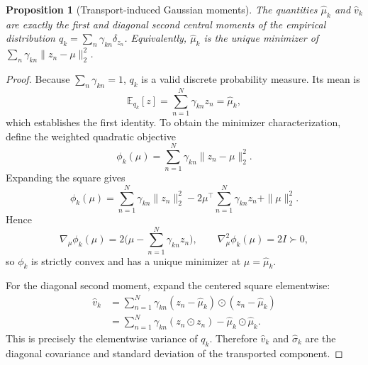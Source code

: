 \documentclass[journal]{IEEEtran}
\newtheorem{proposition}{Proposition}
\begin{document}
\begin{proposition}[Transport-induced Gaussian moments]
The quantities \(\hat{\mu}_k\) and \(\hat{v}_k\) are exactly the first and diagonal second central moments of the empirical distribution \(q_k = \sum_n \gamma_{kn}\delta_{z_n}\). Equivalently, \(\hat{\mu}_k\) is the unique minimizer of \(\sum_n \gamma_{kn}\|z_n-\mu\|_2^2\).
\end{proposition}
\begin{proof}
Because \(\sum_n \gamma_{kn}=1\), \(q_k\) is a valid discrete probability measure. Its mean is
\begin{equation}
\mathbb{E}_{q_k}[z] = \sum_{n=1}^N \gamma_{kn} z_n = \hat{\mu}_k,
\end{equation}
which establishes the first identity. To obtain the minimizer characterization, define the weighted quadratic objective
\begin{equation}
\phi_k(\mu) = \sum_{n=1}^N \gamma_{kn}\|z_n-\mu\|_2^2.
\end{equation}
Expanding the square gives
\begin{equation}
\phi_k(\mu)
= \sum_{n=1}^N \gamma_{kn}\|z_n\|_2^2 - 2\mu^\top\sum_{n=1}^N \gamma_{kn}z_n + \|\mu\|_2^2.
\end{equation}
Hence
\begin{equation}
\nabla_\mu \phi_k(\mu) = 2\Big(\mu - \sum_{n=1}^N \gamma_{kn}z_n\Big),
\qquad
\nabla_\mu^2 \phi_k(\mu) = 2I \succ 0,
\end{equation}
so \(\phi_k\) is strictly convex and has a unique minimizer at \(\mu = \hat{\mu}_k\).

For the diagonal second moment, expand the centered square elementwise:
\begin{align}
\hat{v}_k
&= \sum_{n=1}^N \gamma_{kn}(z_n-\hat{\mu}_k)\odot(z_n-\hat{\mu}_k) \nonumber\\
&= \sum_{n=1}^N \gamma_{kn}(z_n\odot z_n) - \hat{\mu}_k\odot\hat{\mu}_k.
\end{align}
This is precisely the elementwise variance of \(q_k\). Therefore \(\hat{v}_k\) and \(\hat{\sigma}_k\) are the diagonal covariance and standard deviation of the transported component.

\end{proof}
\end{document}
